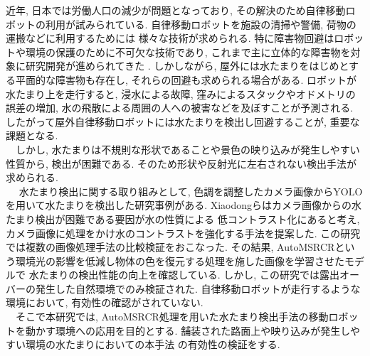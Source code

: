 \documentclass[10pt]{jarticle}
\begin{document}
    近年, 日本では労働人口の減少が問題となっており, 
    その解決のため自律移動ロボットの利用が試みられている. 
    自律移動ロボットを施設の清掃や警備, 荷物の運搬などに利用するためには
    様々な技術が求められる. 
    特に障害物回避はロボットや環境の保護のために不可欠な技術であり, 
    これまで主に立体的な障害物を対象に研究開発が進められてきた\cite{朝田2019} . 
    しかしながら, 屋外には水たまりをはじめとする平面的な障害物も存在し, 
    それらの回避も求められる場合がある. ロボットが水たまり上を走行すると, 
    浸水による故障, 窪みによるスタックやオドメトリの誤差の増加, 
    水の飛散による周囲の人への被害などを及ぼすことが予測される. 
    したがって屋外自律移動ロボットには水たまりを検出し回避することが, 
    重要な課題となる.\\ 
    　しかし, 水たまりは不規則な形状であることや景色の映り込みが発生しやすい性質から, 
    検出が困難である. そのため形状や反射光に左右されない検出手法が求められる.\\
    　 水たまり検出に関する取り組みとして, 
    色調を調整したカメラ画像からYOLOを用いて水たまりを検出した研究事例がある. 
    Xiaodongら\cite{Xiaodong2022}はカメラ画像からの水たまり検出が困難である要因が水の性質による
    低コントラスト化にあると考え, カメラ画像に処理をかけ水のコントラストを強化する手法を提案した. 
    この研究では複数の画像処理手法の比較検証をおこなった. 
    その結果, AutoMSRCRという環境光の影響を低減し物体の色を復元する処理を施した画像を学習させたモデルで
    水たまりの検出性能の向上を確認している. 
    しかし, この研究では露出オーバーの発生した自然環境でのみ検証された.  
    自律移動ロボットが走行するような環境において, 有効性の確認がされていない.   \\
    　そこで本研究では, AutoMSRCR処理を用いた水たまり検出手法の移動ロボットを動かす環境への応用を目的とする. 
    舗装された路面上や映り込みが発生しやすい環境の水たまりにおいての本手法
    の有効性の検証をする.
\end{document}
